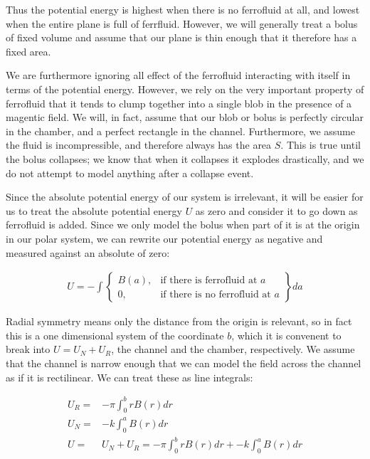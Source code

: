 \documentclass{asme2ej}
\begin{document}
Thus the potential energy is highest when there is no ferrofluid at all,
and lowest when the entire plane is full of ferrfluid.
However, we will generally treat a bolus of fixed volume and assume
that our plane is thin enough that it therefore has a fixed area.


We are furthermore ignoring all effect of the ferrofluid
interacting with itself in terms
of the potential energy.
However, we rely on the very important property of ferrofluid that
it tends to clump together into a single blob in the presence
of a magentic field.
We will, in fact, assume that our blob or bolus is perfectly
circular in the chamber,
and a perfect rectangle in the channel. Furthermore,
we assume the fluid is incompressible,
and therefore always has the area $S$.
This is true until the bolus collapses; we know that
when it collapses it explodes drastically,
and we do not attempt to model anything after
a collapse event.

Since the absolute potential energy of our system is irrelevant,
it will be easier for us to treat the absolute potential energy $U$
as zero and consider it to go down as ferrofluid is added.
Since we only model the bolus when part of it is at the origin
in our polar system, we can rewrite our potential energy as negative
and measured against an absolute of zero:

\begin{align}
  U = - \int
\left\{
    \begin{array}{lr}
      B(a)  , & \text{if there is ferrofluid at } a \\
      0 , & \text{if there is no ferrofluid at } a
    \end{array}
\right\} da
\end{align}

Radial symmetry means only the distance from the origin is relevant, so
in fact this is a one dimensional system of the coordinate $b$, which
it is convenent to break into $U = U_N + U_R$,
the channel and the chamber, respectively. We assume that the channel is narrow
enough that we can model the field across the channel as if it is rectilinear.
We can treat these as line integrals:

\begin{align}
  U_R = & -\pi \int_0^b r B(r) dr \\
  U_N = & -k\int_0^a B(r) dr\\
  U = & U_N + U_R = -\pi \int_0^b r B(r) dr  + -k\int_0^a B(r) dr
\end{align}
\end{document}
